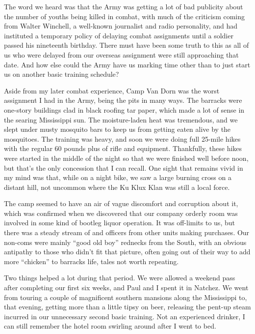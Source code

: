 The word we heard was that the Army was getting a lot of bad publicity about the number of youths being killed in combat, with much of the criticism coming from Walter Winchell, a well-known journalist and radio personality, and had instituted a temporary policy of delaying combat assignments until a soldier passed his nineteenth birthday. There must have been some truth to this as all of us who were delayed from our overseas assignment were still approaching that date. And how else could the Army have us marking time other than to just start us on another basic training schedule?

Aside from my later combat experience, Camp Van Dorn was the worst assignment I had in the Army, being the pits in many ways. The barracks were one-story buildings clad in black roofing tar paper, which made a lot of sense in the searing Mississippi sun. The moisture-laden heat was tremendous, and we slept under musty mosquito bars to keep us from getting eaten alive by the mosquitoes. The training was heavy, and soon we were doing full 25-mile hikes with the regular 60 pounds plus of rifle and equipment. Thankfully, these hikes were started in the middle of the night so that we were finished well before noon, but that's the only concession that I can recall. One sight that remains vivid in my mind was that, while on a night bike, we saw a large burning cross on a distant hill, not uncommon where the Ku Klux Klan was still a local force.

The camp seemed to have an air of vague discomfort and corruption about it, which was confirmed when we discovered that our company orderly room was involved in some kind of bootleg liquor operation. It was off-limits to us, but there was a steady stream of and officers from other units making purchases. Our non-coms were mainly ``good old boy'' rednecks from the South, with an obvious antipathy to those who didn't fit that picture, often going out of their way to add more ``chicken'' to barracks life, tales not worth repeating.

Two things helped a lot during that period. We were allowed a weekend pass after completing our first six weeks, and Paul and I spent it in Natchez. We went from touring a couple of magnificent southern mansions along the Mississippi to, that evening, getting more than a little tipsy on beer, releasing the pent-up steam incurred in our unnecessary second basic training. Not an experienced drinker, I can still remember the hotel room swirling around after I went to bed.


